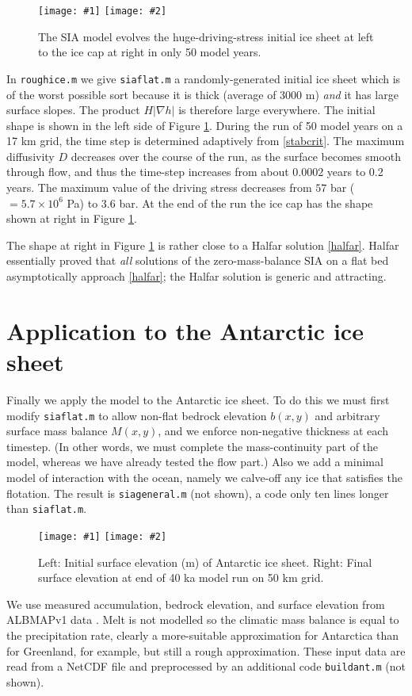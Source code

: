 \documentclass[letterpaper,final,12pt,reqno]{amsart}
\newcommand{\grad}{\nabla}
\newcommand{\twofigsizes}[5]{
\begin{figure}[ht]
\centering
\texttt{[image: \#1]} \quad
\texttt{[image: \#2]}
\caption{#3}
\label{fig:#1}
\end{figure}}
\begin{document}
\twofigsizes{roughinitial}{roughfinal}{The SIA model evolves the huge-driving-stress initial ice sheet at left to the ice cap at right in only 50 model years.}{2.9in}{2.9in}

In \texttt{roughice.m} we give \texttt{siaflat.m} a randomly-generated initial ice sheet which is of the worst possible sort because it is thick (average of 3000 m) \emph{and} it has large surface slopes.  The product $H|\grad h|$ is therefore large everywhere.  The initial shape is shown in the left side of Figure \ref{fig:roughinitial}.  During the run of 50 model years on a 17 km grid, the time step is determined adaptively from \eqref{stabcrit}.  The maximum diffusivity $D$ decreases over the course of the run, as the surface becomes smooth through flow, and thus the time-step increases from about 0.0002 years to 0.2 years.  The maximum value of the driving stress decreases from $57$ bar ($= 5.7\times 10^6$ Pa) to $3.6$ bar.  At the end of the run the ice cap has the shape shown at right in Figure \ref{fig:roughinitial}.

The shape at right in Figure \ref{fig:roughinitial} is rather close to a Halfar solution \eqref{halfar}.  Halfar essentially proved that \emph{all} solutions of the zero-mass-balance SIA on a flat bed asymptotically approach \eqref{halfar}; the Halfar solution is generic and attracting.


\section{Application to the Antarctic ice sheet}   \label{sec:antapp}

Finally we apply the model to the Antarctic ice sheet.  To do this we must first modify \texttt{siaflat.m} to allow non-flat bedrock elevation $b(x,y)$ and arbitrary surface mass balance $M(x,y)$, and we enforce non-negative thickness at each timestep.  (In other words, we must complete the mass-continuity part of the model, whereas we have already tested the flow part.)  Also we add a minimal model of interaction with the ocean, namely we calve-off any ice that satisfies the flotation.  The result is \texttt{siageneral.m} (not shown), a code only ten lines longer than \texttt{siaflat.m}.

\twofigsizes{antinitial}{antfinal}{Left: Initial surface elevation (m) of Antarctic ice sheet.  Right: Final surface elevation at end of 40 ka model run on 50 km grid.}{2.55in}{3.2in}

We use measured accumulation, bedrock elevation, and surface elevation from ALBMAPv1 data \cite{LeBrocqetal2010}.  Melt is not modelled so the climatic mass balance is equal to the precipitation rate, clearly a more-suitable approximation for Antarctica than for Greenland, for example, but still a rough approximation.  These input data are read from a NetCDF file and preprocessed by an additional code \texttt{buildant.m} (not shown).
\end{document}
